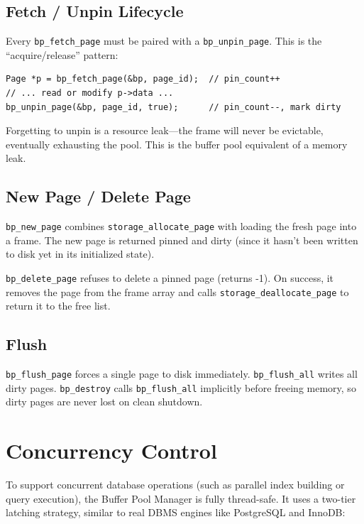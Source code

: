 \documentclass[12pt, a4paper]{report}
\begin{document}
\subsection{Fetch / Unpin Lifecycle}

Every \texttt{bp\_fetch\_page} must be paired with a \texttt{bp\_unpin\_page}.
This is the ``acquire/release'' pattern:

\begin{lstlisting}
Page *p = bp_fetch_page(&bp, page_id);  // pin_count++
// ... read or modify p->data ...
bp_unpin_page(&bp, page_id, true);      // pin_count--, mark dirty
\end{lstlisting}

Forgetting to unpin is a resource leak---the frame will never be evictable,
eventually exhausting the pool. This is the buffer pool equivalent of a
memory leak.

\subsection{New Page / Delete Page}

\texttt{bp\_new\_page} combines \texttt{storage\_allocate\_page} with loading
the fresh page into a frame. The new page is returned pinned and dirty (since
it hasn't been written to disk yet in its initialized state).

\texttt{bp\_delete\_page} refuses to delete a pinned page (returns -1). On
success, it removes the page from the frame array and calls
\texttt{storage\_deallocate\_page} to return it to the free list.

\subsection{Flush}

\texttt{bp\_flush\_page} forces a single page to disk immediately.
\texttt{bp\_flush\_all} writes all dirty pages. \texttt{bp\_destroy} calls
\texttt{bp\_flush\_all} implicitly before freeing memory, so dirty pages are
never lost on clean shutdown.


\section{Concurrency Control}

To support concurrent database operations (such as parallel index building or query execution), the Buffer Pool Manager is fully thread-safe. It uses a two-tier latching strategy, similar to real DBMS engines like PostgreSQL and InnoDB:
\end{document}
